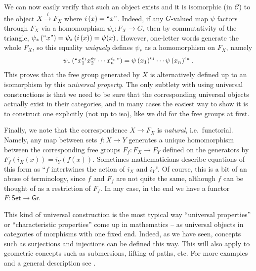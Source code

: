 \begin{example}
We can now easily verify that such an object exists and it is isomorphic
(in $\mathcal{C}$) to the object $X\overset{i}{\to}F_{X}$ where
$i\left(x\right)=``x"$. Indeed, if any $G$-valued map $\psi$ factors
through $F_{X}$ via a homomorphism $\psi_{\ast}:F_{X}\to G$, then
by commutativity of the triangle, $\psi_{\ast}\left(``x"\right)=\psi_{\ast}\left(i\left(x\right)\right)=\psi(x)$.
However, one-letter words generate the whole $F_{X}$, so this equality
\emph{uniquely} defines $\psi_{\ast}$ as a homomorphism on $F_{X}$,
namely
\begin{equation}
\psi_{\ast}\left(``x_{1}^{\epsilon_{1}}x_{2}^{\epsilon_{2}}\cdots x_{n}^{\epsilon_{n}}"\right)=\psi\left(x_{1}\right)^{\epsilon_{1}}\cdots\psi\left(x_{n}\right)^{\epsilon_{n}}.
\end{equation}
This proves that the free group generated by $X$ is alternatively
defined up to an isomorphism by this \emph{universal property}.
The only subtlety with using universal constructions is that we need
to be sure that the corresponding universal objects actually exist
in their categories, and in many cases the easiest way to show it
is to construct one explicitly (not up to iso), like we did for the
free groups at first.

Finally, we note that the correspondence $X\to F_X$ is \emph{natural}, i.e.\ functorial. Namely, any map between sets $f:X\to Y$ generates a unique homomorphism between the corresponding free groups $F_f:F_X\to F_Y$ defined on the generators by $F_f (i_X(x))=i_Y(f(x))$. Sometimes mathematicians describe equations of this form as ``$f$ intertwines the action of $i_X$ and $i_Y$''. Of course, this is a bit of an abuse of terminology, since $f$ and $F_f$ are not quite the same, although $f$ can be thought of as a restriction of $F_f$. In any case, in the end we have a functor $F:\mathsf{Set}\to\mathsf{Gr}$.

This kind of universal construction is the most typical way ``universal properties'' or ``characteristic properties'' come up in mathematics -- as universal objects in categories of morphisms with one fixed end. Indeed, as we have seen, concepts such as surjections and injections can be defined this way. This will also apply to geometric concepts such as submersions, lifting of paths, etc. For more examples and a general description see \cite[Exercise~7.8:24 and Def.~7.8:12]{Bergman}.
\end{example}
